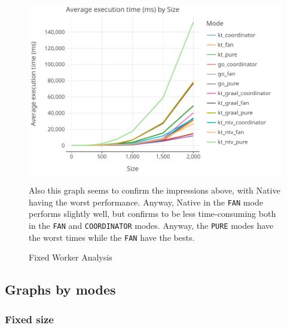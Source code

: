 \begin{figure}[H]
	\centering
	\begin{minipage}{0.7\textwidth}
		\centering
		\includegraphics[width=\textwidth]{img/graphs/fixed_workers_all}
		\caption{Fixed Worker Analysis}
	\end{minipage}\hfill
	\begin{minipage}{0.25\textwidth}
		Also this graph seems to confirm the impressions above, with \Kotlin Native having the worst performance. Anyway, \Kotlin Native in the \texttt{FAN} mode performs slightly well, but \Go confirms to be less time-consuming both in the \texttt{FAN} and \texttt{COORDINATOR} modes. Anyway, the \texttt{PURE} modes have the worst times while the \texttt{FAN} have the bests.
	\end{minipage}
\end{figure}

\subsection{Graphs by modes}

\subsubsection{Fixed size}

